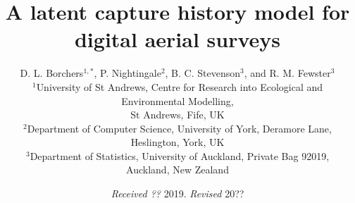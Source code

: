 \documentclass[useAMS, usenatbib, referee]{biom}\usepackage[]{graphicx}\usepackage[]{color}
\begin{document}
\title{A latent capture history model for digital aerial surveys}

\author{D. L. Borchers\(^{1, *}\),
P. Nightingale\(^{2}\),
B. C. Stevenson\(^{3}\), and
R. M. Fewster\(^{3}\) \\
\(^1\)University of St Andrews, Centre for Research into Ecological and Environmental Modelling, \\St Andrews, Fife, UK \\
\(^2\)Department of Computer Science, University of York, Deramore Lane, Heslington, York, UK \\
\(^3\)Department of Statistics, University of Auckland, Private Bag 92019, \\ Auckland, New Zealand
}




\date{{\it Received ??} 2019. {\it Revised } 20??}

\pagerange{\pageref{firstpage}--\pageref{lastpage}} 



\label{firstpage}

\end{document}
